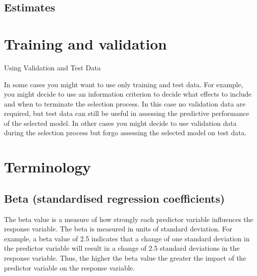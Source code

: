 

\subsection{Estimates}


\newpage






\section{Training and validation}
Using Validation and Test Data


In some cases you might want to use only training and test data. For example, you might decide to use an information criterion to decide what effects to include and when to terminate the selection process. In this case no validation data are required, but test data can still be useful in assessing the predictive performance of the selected model. In other cases you might decide to use validation data during the selection process but forgo assessing the selected model on test data. 




\section{Terminology}
\subsection{Beta (standardised regression coefficients)}
The beta value is a measure of how strongly each predictor variable influences the
response variable. The beta is measured in units of standard deviation. For example,
a beta value of 2.5 indicates that a change of one standard deviation in the predictor
variable will result in a change of 2.5 standard deviations in the response variable.
Thus, the higher the beta value the greater the impact of the predictor variable on
the response variable.


